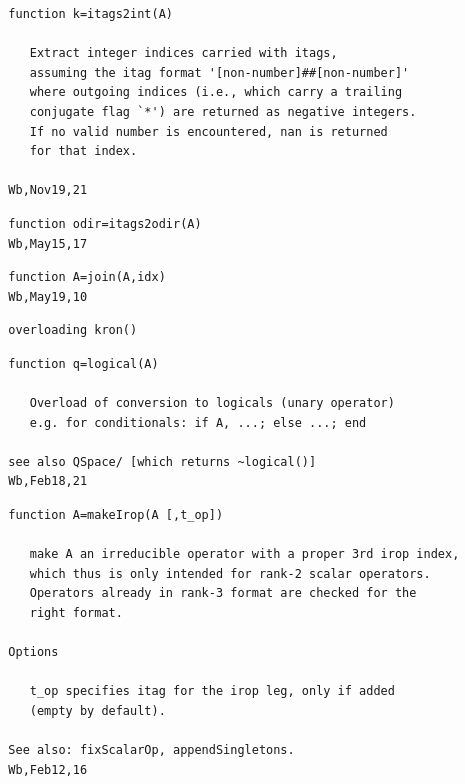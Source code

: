 \documentclass[twoside,12pt]{article}
\begin{document}
\pagebreak[3]



\begin{verbatim}
  function k=itags2int(A)
 
     Extract integer indices carried with itags,
     assuming the itag format '[non-number]##[non-number]'
     where outgoing indices (i.e., which carry a trailing
     conjugate flag `*') are returned as negative integers.
     If no valid number is encountered, nan is returned
     for that index.
 
  Wb,Nov19,21
\end{verbatim}

\pagebreak[3]



\begin{verbatim}
  function odir=itags2odir(A)
  Wb,May15,17
\end{verbatim}

\pagebreak[3]



\begin{verbatim}
  function A=join(A,idx)
  Wb,May19,10
\end{verbatim}

\pagebreak[3]



\begin{verbatim}
  overloading kron()
\end{verbatim}

\pagebreak[3]



\begin{verbatim}
  function q=logical(A)
 
     Overload of conversion to logicals (unary operator)
     e.g. for conditionals: if A, ...; else ...; end
 
  see also QSpace/ [which returns ~logical()]
  Wb,Feb18,21
\end{verbatim}

\pagebreak[3]



\begin{verbatim}
  function A=makeIrop(A [,t_op])
 
     make A an irreducible operator with a proper 3rd irop index,
     which thus is only intended for rank-2 scalar operators.
     Operators already in rank-3 format are checked for the
     right format.
 
  Options
 
     t_op specifies itag for the irop leg, only if added
     (empty by default).
 
  See also: fixScalarOp, appendSingletons.
  Wb,Feb12,16
\end{verbatim}
\end{document}
